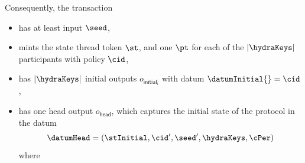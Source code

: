 \noindent Consequently, the \mtxInit{} transaction
\begin{itemize}
  \item has at least input $\seed$,
  \item mints the state thread token $\st$, and one $\pt$ for each of the $|\hydraKeys|$
  participants with policy $\cid$,
  \item has $|\hydraKeys|$ initial outputs $o_{\mathsf{initial}_{i}}$ with datum $\datumInitial{} = \cid$,
  \item has one head output
  $o_{\mathsf{head}}$, which captures
  the initial state of the protocol in the datum
  \[
	\datumHead = (\stInitial,\cid',\seed',\hydraKeys,\cPer)
  \]
  where
\end{itemize}

